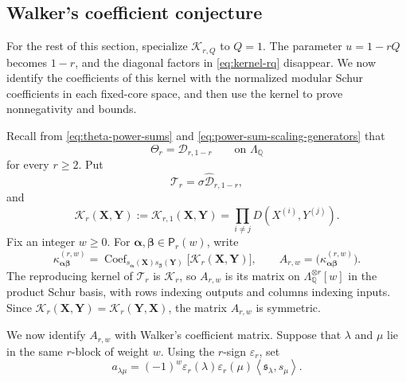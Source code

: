 \documentclass[12pt,reqno,a4paper]{amsart}
\numberwithin{equation}{section}
\numberwithin{figure}{section}
\theoremstyle{plain}
\theoremstyle{definition}
\newcommand{\eps}{\varepsilon}
\newcommand{\inner}[2]{\left\langle #1,#2\right\rangle}
\DeclareMathOperator{\Coef}{Coef}
\begin{document}
\subsection{Walker's coefficient conjecture}
\label{subsec:coefficient-conjecture-proof}
\label{subsec:positive-expansions-bounds}

For the rest of this section, specialize $\mathcal K_{r,Q}$ to $Q=1$.
The parameter $u=1-rQ$ becomes $1-r$, and the diagonal factors in
\eqref{eq:kernel-rq} disappear.  We now identify the coefficients of
this kernel with the normalized modular Schur coefficients in each
fixed-core space, and then use the kernel to prove nonnegativity
and bounds.

Recall from \eqref{eq:theta-power-sums} and
\eqref{eq:power-sum-scaling-generators} that
\begin{equation}\label{eq:theta-as-d}
 \Theta_r=\mathcal D_{r,1-r}
 \qquad\text{on }\Lambda_{\mathbb Q}
\end{equation}
for every $r\geq2$.  Put
\begin{equation}\label{eq:specialized-kernel-operator}
 \mathcal T_r=\sigma\widehat{\mathcal D}_{r,1-r},
\end{equation}
and
\[
 \mathcal K_r(\mathbf X,\mathbf Y)
 :=\mathcal K_{r,1}(\mathbf X,\mathbf Y)
 =\prod_{i\neq j}D(X^{(i)},Y^{(j)}).
\]
Fix an integer $w\geq0$.  For
$\boldsymbol\alpha,\boldsymbol\beta\in\mathsf P_r(w)$, write
\begin{equation}\label{eq:abstract-kappa}
 \kappa^{(r,w)}_{\boldsymbol\alpha\boldsymbol\beta}
 =\Coef_{s_{\boldsymbol\alpha}(\mathbf X)s_{\boldsymbol\beta}(\mathbf Y)}
   \bigl[\mathcal K_r(\mathbf X,\mathbf Y)\bigr],
 \qquad
 A_{r,w}=\bigl(\kappa^{(r,w)}_{\boldsymbol\alpha\boldsymbol\beta}\bigr).
\end{equation}
The reproducing kernel of $\mathcal T_r$ is $\mathcal K_r$, so $A_{r,w}$ is
its matrix on $\Lambda_{\mathbb Q}^{\otimes r}[w]$ in the product
Schur basis, with rows indexing outputs and columns indexing inputs.
Since
$\mathcal K_r(\mathbf X,\mathbf Y)=\mathcal K_r(\mathbf Y,\mathbf X)$,
the matrix $A_{r,w}$ is symmetric.

We now identify $A_{r,w}$ with Walker's coefficient matrix.  Suppose
that $\lambda$ and $\mu$ lie in the same $r$-block of weight $w$.
Using the $r$-sign $\eps_r$, set
\begin{equation}\label{eq:def-a-lambda-mu}
 a_{\lambda\mu}
 =(-1)^w\eps_r(\lambda)\eps_r(\mu)
  \inner{\mathfrak{s}_\lambda}{s_\mu}.
\end{equation}
\end{document}
